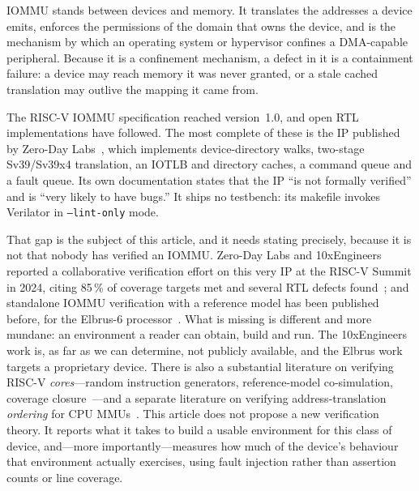 \documentclass[journal]{IEEEtran}
\begin{document}
 IOMMU stands between devices and memory. It translates the
addresses a device emits, enforces the permissions of the domain that owns the
device, and is the mechanism by which an operating system or hypervisor confines
a DMA-capable peripheral. Because it is a confinement mechanism, a defect in it
is a containment failure: a device may reach memory it was never granted, or a
stale cached translation may outlive the mapping it came from.

The RISC-V IOMMU specification reached version~1.0, and open RTL
implementations have followed. The most complete of these is the IP published by
Zero-Day Labs~\cite{rviommu}, which implements device-directory walks, two-stage
Sv39/Sv39x4 translation, an IOTLB and directory caches, a command queue and a
fault queue. Its own documentation states that the IP ``is not formally
verified'' and is ``very likely to have bugs.'' It ships no testbench: its
makefile invokes Verilator in \texttt{--lint-only} mode.

That gap is the subject of this article, and it needs stating precisely,
because it is not that nobody has verified an IOMMU. Zero-Day Labs and
10xEngineers reported a collaborative verification effort on this very IP at the
RISC-V Summit in 2024, citing 85\,\% of coverage targets met and several RTL
defects found~\cite{zdl10x}; and standalone IOMMU verification with a reference
model has been published before, for the Elbrus-6 processor~\cite{elbrus}. What
is missing is different and more mundane: an environment a reader can obtain,
build and run. The 10xEngineers work is, as far as we can determine, not
publicly available, and the Elbrus work targets a proprietary device. There is
also a substantial literature on verifying RISC-V \emph{cores}---random
instruction generators, reference-model co-simulation, coverage
closure~\cite{riscvdv,corevverif}---and a separate literature on verifying
address-translation \emph{ordering} for CPU MMUs~\cite{coatcheck,transform}.
This article does not propose a new verification theory. It reports what it takes to build a usable environment for this class of
device, and---more importantly---measures how much of the device's behaviour
that environment actually exercises, using fault injection rather than assertion
counts or line coverage.
\end{document}
